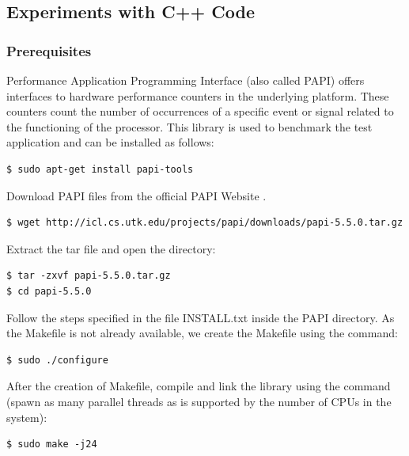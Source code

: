 \subsection{Experiments with C++ Code}
\label{4_1_2}

\subsubsection{Prerequisites}
\label{4_1_2_1}
Performance Application Programming Interface (also called PAPI) offers interfaces to hardware performance counters in the underlying platform. These counters count the number of occurrences of a specific event or signal related to the functioning of the processor. This library is used to benchmark the test application and can be installed as follows:
\begin{scriptsize}
\linuxbash
\begin{lstlisting}
$ sudo apt-get install papi-tools
\end{lstlisting}
\end{scriptsize}
Download PAPI files from the official PAPI Website \cite{papi_official}.
\begin{scriptsize}
\linuxbash
\begin{lstlisting}
$ wget http://icl.cs.utk.edu/projects/papi/downloads/papi-5.5.0.tar.gz
\end{lstlisting}
\end{scriptsize}
Extract the tar file and open the directory:
\begin{scriptsize}
\linuxbash
\begin{lstlisting}
$ tar -zxvf papi-5.5.0.tar.gz
$ cd papi-5.5.0
\end{lstlisting}
\end{scriptsize}
Follow the steps specified in the file INSTALL.txt inside the PAPI directory.\newline
As the Makefile is not already available, we create the Makefile using the command:
\begin{scriptsize}
\linuxbash
\begin{lstlisting}
$ sudo ./configure
\end{lstlisting}
\end{scriptsize}
After the creation of Makefile, compile and link the library using the command (spawn as many parallel threads as is supported by the number of CPUs in the system):
\begin{scriptsize}
\linuxbash
\begin{lstlisting}
$ sudo make -j24
\end{lstlisting}
\end{scriptsize}

